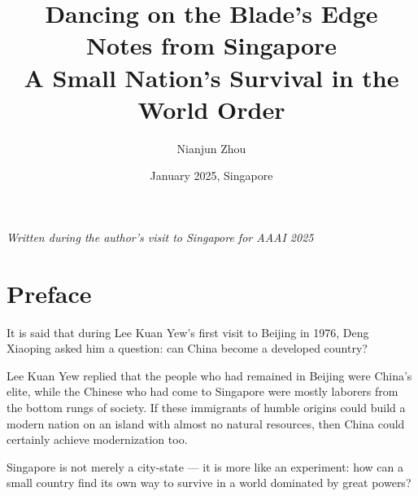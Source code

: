 \documentclass[12pt, a4paper]{book}
\title{
    {\Huge\textbf{Dancing on the Blade's Edge}}\\[0.5em]
    {\Large Notes from Singapore}\\[1em]
    {\large A Small Nation's Survival in the World Order}
}
\author{Nianjun Zhou}
\date{January 2025, Singapore}
\begin{document}
\frontmatter
\maketitle

\vspace{2em}
\begin{center}
\textit{Written during the author's visit to Singapore for AAAI 2025}
\end{center}

\chapter*{Preface}

It is said that during Lee Kuan Yew's first visit to Beijing in 1976, Deng Xiaoping asked him a question: can China become a developed country?

Lee Kuan Yew replied that the people who had remained in Beijing were China's elite, while the Chinese who had come to Singapore were mostly laborers from the bottom rungs of society. If these immigrants of humble origins could build a modern nation on an island with almost no natural resources, then China could certainly achieve modernization too.

Singapore is not merely a city-state — it is more like an experiment: how can a small country find its own way to survive in a world dominated by great powers?

\tableofcontents

\mainmatter






\end{document}
